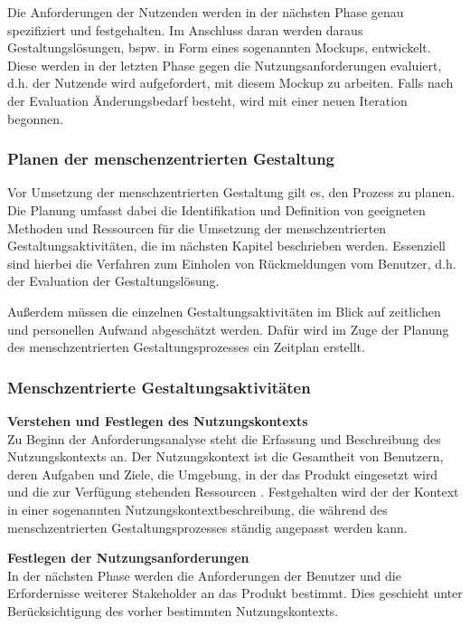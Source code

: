\documentclass[utf8,biblatex]{lni}
\begin{document}
Die Anforderungen der Nutzenden werden in der nächsten Phase genau spezifiziert und festgehalten. Im Anschluss daran werden daraus Gestaltungslösungen, bspw. in Form eines sogenannten Mockups, entwickelt. Diese werden in der letzten Phase gegen die Nutzungsanforderungen evaluiert, d.h. der Nutzende wird aufgefordert, mit diesem Mockup zu arbeiten. Falls nach der Evaluation Änderungsbedarf besteht, wird mit einer neuen Iteration begonnen. 


\subsubsection{Planen der menschenzentrierten Gestaltung}
Vor Umsetzung der menschzentrierten Gestaltung gilt es, den Prozess zu planen. Die Planung umfasst dabei die Identifikation und Definition von geeigneten Methoden und Ressourcen für die Umsetzung der menschzentrierten Gestaltungsaktivitäten, die im nächsten Kapitel beschrieben werden. Essenziell sind hierbei die Verfahren zum Einholen von Rückmeldungen vom Benutzer, d.h. der Evaluation der Gestaltungslösung.

Außerdem müssen die einzelnen Gestaltungsaktivitäten im Blick auf zeitlichen und personellen Aufwand abgeschätzt werden. Dafür wird im Zuge der Planung des menschzentrierten Gestaltungsprozesses ein Zeitplan erstellt.


\subsubsection{Menschzentrierte Gestaltungsaktivitäten}

\textbf{Verstehen und Festlegen des Nutzungskontexts}\\
Zu Beginn der Anforderungsanalyse steht die Erfassung und Beschreibung des Nutzungskontexts an. Der Nutzungskontext ist die Gesamtheit von Benutzern, deren Aufgaben und Ziele, die Umgebung, in der das Produkt eingesetzt wird und die zur Verfügung stehenden Ressourcen \cite[vgl.][8]{DINDeutschesInstitutfurNormunge.V..}. Festgehalten wird der der Kontext in einer sogenannten Nutzungskontextbeschreibung, die während des menschzentrierten Gestaltungsprozesses ständig angepasst werden kann.

\textbf{Festlegen der Nutzungsanforderungen}\\
In der nächsten Phase werden die Anforderungen der Benutzer und die Erfordernisse weiterer Stakeholder an das Produkt bestimmt. Dies geschieht unter Berücksichtigung des vorher bestimmten Nutzungskontexts. 
\end{document}
